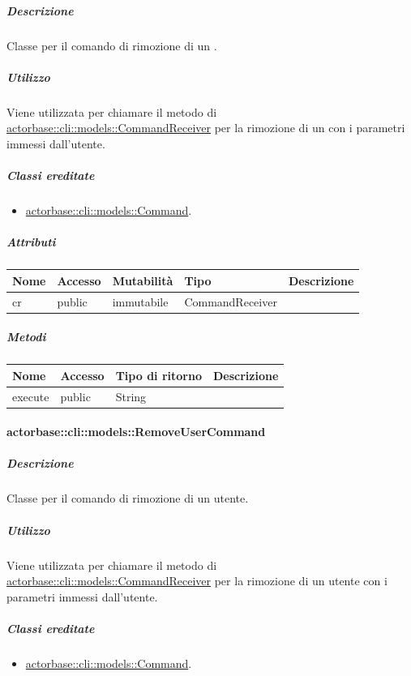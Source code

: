 \documentclass{scalatekids-article}
\begin{document}
\subparagraph{Descrizione}

Classe per il comando di rimozione di un .

\subparagraph{Utilizzo}

Viene utilizzata per chiamare il metodo di
\hyperref[sec:actorbase::cli::models::CommandReceiver]{actorbase::cli::models::CommandReceiver} per la rimozione di un 
con i parametri immessi dall'utente.

\subparagraph{Classi ereditate}

\begin{itemize}
\item \hyperref[sec:actorbase::cli::models::Command]{actorbase::cli::models::Command}.
\end{itemize}

\subparagraph{Attributi}

\begin{tabular}{| l | l | l | l | l |}
  \hline
  Nome & Accesso & Mutabilità & Tipo & Descrizione\\
  \hline
  cr & public & immutabile & CommandReceiver & \\
  \hline
\end{tabular}

\subparagraph{Metodi}

\begin{tabular}{| l | l | l | l |}
  \hline
  Nome & Accesso & Tipo di ritorno & Descrizione\\
  \hline
  execute & public & String & \\
  \hline
\end{tabular}

\paragraph{actorbase::cli::models::RemoveUserCommand}
\label{sec:actorbase::cli::models::RemoveUserCommand}

\subparagraph{Descrizione}

Classe per il comando di rimozione di un utente.

\subparagraph{Utilizzo}

Viene utilizzata per chiamare il metodo di
\hyperref[sec:actorbase::cli::models::CommandReceiver]{actorbase::cli::models::CommandReceiver} per la rimozione di un utente con i
parametri immessi dall'utente.

\subparagraph{Classi ereditate}

\begin{itemize}
\item \hyperref[sec:actorbase::cli::models::Command]{actorbase::cli::models::Command}.
\end{itemize}
\end{document}
